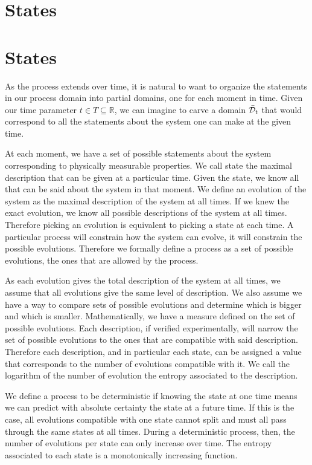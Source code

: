 \documentclass[letterpaper]{article}
\begin{document}
\section{States}

\section{States}

As the process extends over time, it is natural to want to organize the statements in our process domain into partial domains, one for each moment in time. Given our time parameter $t \in T \subseteq \mathbb{R}$, we can imagine to carve a domain $\bar{\mathcal{D}}_t$ that would correspond to all the statements about the system one can make at the given time.


At each moment, we have a set of possible statements about the system corresponding to physically measurable properties. We call state the maximal description that can be given at a particular time. Given the state, we know all that can be said about the system in that moment. We define an evolution of the system as the maximal description of the system at all times. If we knew the exact evolution, we know all possible descriptions of the system at all times. Therefore picking an evolution is equivalent to picking a state at each time. A particular process will constrain how the system can evolve, it will constrain the possible evolutions. Therefore we formally define a process as a set of possible evolutions, the ones that are allowed by the process.

As each evolution gives the total description of the system at all times, we assume that all evolutions give the same level of description. We also assume we have a way to compare sets of possible evolutions and determine which is bigger and which is smaller. Mathematically, we have a measure defined on the set of possible evolutions. Each description, if verified experimentally, will narrow the set of possible evolutions to the ones that are compatible with said description. Therefore each description, and in particular each state, can be assigned a value that corresponds to the number of evolutions compatible with it. We call the logarithm of the number of evolution the entropy associated to the description.

We define a process to be deterministic if knowing the state at one time means we can predict with absolute certainty the state at a future time. If this is the case, all evolutions compatible with one state cannot split and must all pass through the same states at all times. During a deterministic process, then, the number of evolutions per state can only increase over time. The entropy associated to each state is a monotonically increasing function.
\end{document}

